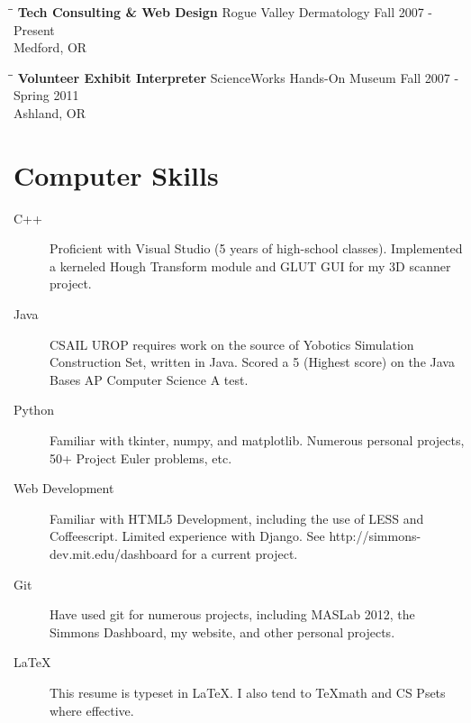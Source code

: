 \documentclass{res}
\begin{document}
\begin{resume}
		\begin{tabbing}%
			\hspace{2.3in}\= \hspace{2.6in}\= \kill %
			{\bf Tech Consulting \& Web Design}	\>Rogue Valley Dermatology	\> Fall 2007 - Present\\
												\>Medford, OR
		\end{tabbing}\vspace{-20pt}

		\begin{tabbing}%
			\hspace{2.3in}\= \hspace{2.6in}\= \kill %
			{\bf Volunteer Exhibit Interpreter}	\>ScienceWorks Hands-On Museum	\> Fall 2007 - Spring 2011\\
												\>Ashland, OR
		\end{tabbing}

	\vspace{-20pt}
	\section{Computer Skills}

		\begin{description}

			\item[C++] Proficient with Visual Studio (5 years of high-school classes). Implemented a kerneled Hough Transform module  and GLUT GUI for my 3D scanner project.

			\item[Java] CSAIL UROP requires work on the source of Yobotics Simulation Construction Set, written in Java. Scored a 5 (Highest score) on the Java Bases AP Computer Science A test.

			\item[Python] Familiar with tkinter, numpy, and matplotlib. Numerous personal projects, 50+ Project Euler problems, etc.

			\item[Web Development] Familiar with HTML5 Development, including the use of LESS and Coffeescript. Limited experience with Django. See http://simmons-dev.mit.edu/dashboard for a current project.

			\item[Git] Have used git for numerous projects, including MASLab 2012, the Simmons Dashboard, my website, and other personal projects.

			\item[\LaTeX] This resume is typeset in \LaTeX. I also tend to \TeX \space math and CS Psets where effective.


\end{description}
\end{resume}
\end{document}
